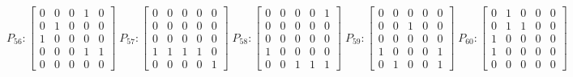     $$
        P_{56} : \begin{bmatrix}
            0 & 0 & 0 & 1 & 0 \\
            0 & 1 & 0 & 0 & 0 \\
            1 & 0 & 0 & 0 & 0 \\
            0 & 0 & 0 & 1 & 1 \\
            0 & 0 & 0 & 0 & 0
        \end{bmatrix}
        \;
         P_{57} : \begin{bmatrix}
            0 & 0 & 0 & 0 & 0 \\
            0 & 0 & 0 & 0 & 0 \\
            0 & 0 & 0 & 0 & 0 \\
            1 & 1 & 1 & 1 & 0 \\
            0 & 0 & 0 & 0 & 1
        \end{bmatrix}
        \;
        P_{58} : \begin{bmatrix}
            0 & 0 & 0 & 0 & 1 \\
            0 & 0 & 0 & 0 & 0 \\
            0 & 0 & 0 & 0 & 0 \\
            1 & 0 & 0 & 0 & 0 \\
            0 & 0 & 1 & 1 & 1
        \end{bmatrix}
        \; 
        P_{59} : \begin{bmatrix}
            0 & 0 & 0 & 0 & 0 \\
            0 & 0 & 1 & 0 & 0 \\
            0 & 0 & 0 & 0 & 0 \\
            1 & 0 & 0 & 0 & 1 \\
            0 & 1 & 0 & 0 & 1
        \end{bmatrix}
        \;
        P_{60} : \begin{bmatrix}
            0 & 1 & 0 & 0 & 0 \\
            0 & 1 & 1 & 0 & 0 \\
            1 & 0 & 0 & 0 & 0 \\
            1 & 0 & 0 & 0 & 0 \\
            0 & 0 & 0 & 0 & 0
        \end{bmatrix}
    $$

